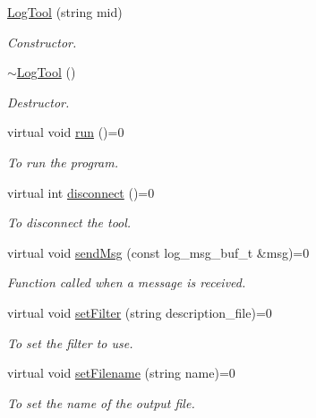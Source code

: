 \begin{DoxyCompactItemize}
\item 
\hyperlink{classLogTool_a74927bb4d3677833aca77b392f727c2d}{LogTool} (string mid)
\begin{DoxyCompactList}\small\item\em Constructor. \item\end{DoxyCompactList}\item 
\hypertarget{classLogTool_afc613143fffe22b6ad9dfdf4f4802d89}{
\hyperlink{classLogTool_afc613143fffe22b6ad9dfdf4f4802d89}{$\sim$LogTool} ()}
\label{classLogTool_afc613143fffe22b6ad9dfdf4f4802d89}

\begin{DoxyCompactList}\small\item\em Destructor. \item\end{DoxyCompactList}\item 
\hypertarget{classLogTool_adbe320ee4774446c04659f0742011481}{
virtual void \hyperlink{classLogTool_adbe320ee4774446c04659f0742011481}{run} ()=0}
\label{classLogTool_adbe320ee4774446c04659f0742011481}

\begin{DoxyCompactList}\small\item\em To run the program. \item\end{DoxyCompactList}\item 
virtual int \hyperlink{classLogTool_a4bf35f0e87500ef2c8679a975c7880a2}{disconnect} ()=0
\begin{DoxyCompactList}\small\item\em To disconnect the tool. \item\end{DoxyCompactList}\item 
virtual void \hyperlink{classLogTool_a46d2c266ef709e801bfd651089312422}{sendMsg} (const log\_\-msg\_\-buf\_\-t \&msg)=0
\begin{DoxyCompactList}\small\item\em Function called when a message is received. \item\end{DoxyCompactList}\item 
virtual void \hyperlink{classLogTool_a10da74570e9bac6082a06c9710612a6c}{setFilter} (string description\_\-file)=0
\begin{DoxyCompactList}\small\item\em To set the filter to use. \item\end{DoxyCompactList}\item 
virtual void \hyperlink{classLogTool_a4cdf12439d3a93fb3c1441a2df2a7235}{setFilename} (string name)=0
\begin{DoxyCompactList}\small\item\em To set the name of the output file. \item\end{DoxyCompactList}\end{DoxyCompactItemize}
